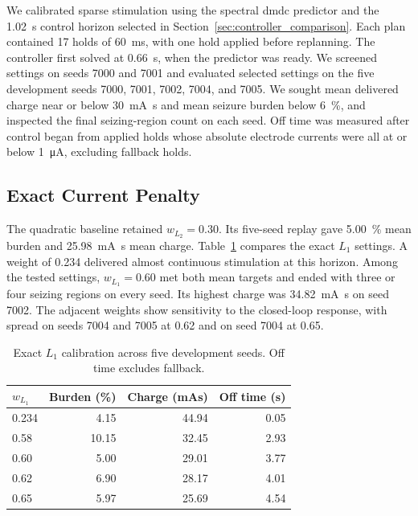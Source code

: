 We calibrated sparse stimulation using the spectral \ac{dmdc} predictor and the \SI{1.02}{\second} control horizon selected in Section~\ref{sec:controller_comparison}.
Each plan contained 17 holds of \SI{60}{\milli\second}, with one hold applied before replanning.
The controller first solved at \SI{0.66}{\second}, when the predictor was ready.
We screened settings on seeds 7000 and 7001 and evaluated selected settings on the five development seeds 7000, 7001, 7002, 7004, and 7005.
We sought mean delivered charge near or below \SI{30}{\milli\ampere\second} and mean seizure burden below \SI{6}{\percent}, and inspected the final seizing-region count on each seed.
Off time was measured after control began from applied holds whose absolute electrode currents were all at or below \SI{1}{\micro\ampere}, excluding fallback holds.

\subsection{Exact Current Penalty}

The quadratic baseline retained \(w_{L_2}=0.30\).
Its five-seed replay gave \SI{5.00}{\percent} mean burden and \SI{25.98}{\milli\ampere\second} mean charge.
Table~\ref{tab:sparse_calibration_l1} compares the exact \(L_1\) settings.
A weight of 0.234 delivered almost continuous stimulation at this horizon.
Among the tested settings, \(w_{L_1}=0.60\) met both mean targets and ended with three or four seizing regions on every seed.
Its highest charge was \SI{34.82}{\milli\ampere\second} on seed 7002.
The adjacent weights show sensitivity to the closed-loop response, with spread on seeds 7004 and 7005 at 0.62 and on seed 7004 at 0.65.

\begin{table}
  \centering
  \caption{Exact \(L_1\) calibration across five development seeds. Off time excludes fallback.}\label{tab:sparse_calibration_l1}
  \begin{tabular}{@{}lrrr@{}}
    \toprule
    \(w_{L_1}\) & Burden (\%) & Charge (mAs) & Off time (s) \\
    \midrule
    0.234 &  4.15 & 44.94 & 0.05 \\
    0.58  & 10.15 & 32.45 & 2.93 \\
    0.60  &  5.00 & 29.01 & 3.77 \\
    0.62  &  6.90 & 28.17 & 4.01 \\
    0.65  &  5.97 & 25.69 & 4.54 \\
    \bottomrule
  \end{tabular}
\end{table}

